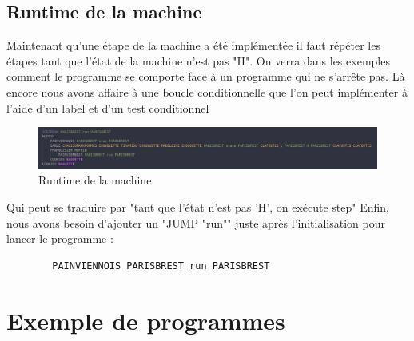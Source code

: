 \documentclass[11pt,colorlinks=true,a4paper]{article}
\begin{document}
    \subsection{Runtime de la machine}
    Maintenant qu'une étape de la machine a été implémentée il faut répéter les étapes tant que l'état de la machine n'est pas "H". 
    On verra dans les exemples comment le programme se comporte face à un programme qui ne s'arrête pas. Là encore nous avons affaire 
    à une boucle conditionnelle que l'on peut implémenter à l'aide d'un label et d'un test conditionnel\par \bigskip
    \begin{figure}[H]
        \center 
        \includegraphics[width=\textwidth]{img/runtime.png}
        \caption{Runtime de la machine}
    \end{figure}
    Qui peut se traduire par "tant que l'état n'est pas 'H', on exécute step"
    Enfin, nous avons besoin d'ajouter un "JUMP "run"" juste après l'initialisation pour lancer le programme : 
    \begin{lstlisting}
        PAINVIENNOIS PARISBREST run PARISBREST
    \end{lstlisting}

    \section{Exemple de programmes}
\end{document}
